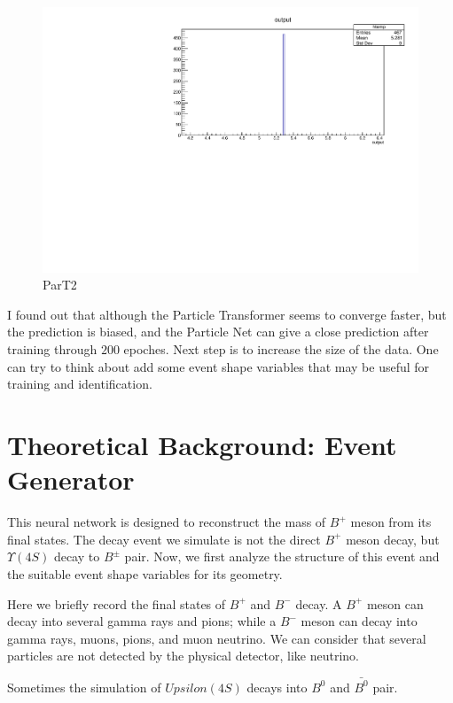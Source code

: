 \documentclass[12pt]{article}
\numberwithin{equation}{section}
\begin{document}
\begin{figure}[H]
    \centering
    \includegraphics[width=0.5\linewidth]{figures/predParT2.pdf}
    \caption{ParT2}
    \label{ParT2}
\end{figure}

I found out that although the Particle Transformer seems to converge faster, but the prediction is biased, and the Particle Net can give a close prediction after training through $200$ epoches.
Next step is to increase the size of the data.
One can try to think about add some event shape variables that may be useful for training and identification.

\section{Theoretical Background: Event Generator}
This neural network is designed to reconstruct the mass of \(B^{+}\) meson from its final states.
The decay event we simulate is not the direct \(B^{+}\) meson decay, but \( \Upsilon ( 4S ) \) decay to \( B^{\pm} \) pair.
Now, we first analyze the structure of this event and the suitable event shape variables for its geometry.

Here we briefly record the final states of \(B^{ + }\) and \(B^{ - }\) decay.
A \(B^{ + }\) meson can decay into several gamma rays and pions; while a \(B^{ - }\) meson can decay into gamma rays, muons, pions, and muon neutrino.
We can consider that several particles are not detected by the physical detector, like neutrino.

Sometimes the simulation of \( Upsilon ( 4S ) \) decays into \( B^0 \) and \( \bar{ B^0 } \) pair.
\end{document}
